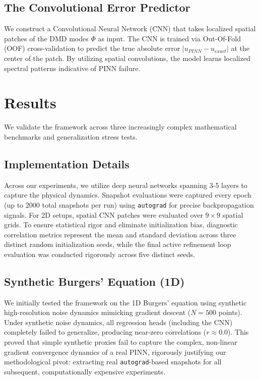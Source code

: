 \documentclass{article}
\begin{document}
\subsection{The Convolutional Error Predictor}
We construct a Convolutional Neural Network (CNN) that takes localized spatial patches of the DMD modes $\Phi$ as input. The CNN is trained via Out-Of-Fold (OOF) cross-validation to predict the true absolute error $|u_{PINN} - u_{exact}|$ at the center of the patch. By utilizing spatial convolutions, the model learns localized spectral patterns indicative of PINN failure.


\section{Results}
We validate the framework across three increasingly complex mathematical benchmarks and generalization stress tests.

\subsection{Implementation Details}
Across our experiments, we utilize deep neural networks spanning 3-5 layers to capture the physical dynamics. Snapshot evaluations were captured every epoch (up to 2000 total snapshots per run) using \texttt{autograd} for precise backpropagation signals. For 2D setups, spatial CNN patches were evaluated over $9 \times 9$ spatial grids. To ensure statistical rigor and eliminate initialization bias, diagnostic correlation metrics represent the mean and standard deviation across three distinct random initialization seeds, while the final active refinement loop evaluation was conducted rigorously across five distinct seeds.

\subsection{Synthetic Burgers' Equation (1D)}
We initially tested the framework on the 1D Burgers' equation using synthetic high-resolution noise dynamics mimicking gradient descent ($N=500$ points). Under synthetic noise dynamics, all regression heads (including the CNN) completely failed to generalize, producing near-zero correlations ($r \approx 0.0$). This proved that simple synthetic proxies fail to capture the complex, non-linear gradient convergence dynamics of a real PINN, rigorously justifying our methodological pivot: extracting real \texttt{autograd}-based snapshots for all subsequent, computationally expensive experiments.
\end{document}
